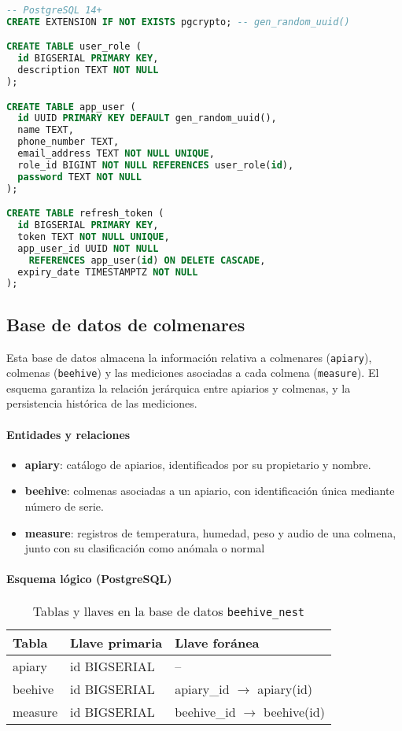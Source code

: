 \begin{lstlisting}[language=SQL, label={lst:guard-database-schema}, caption={Esquema de la base de datos guard-database}]
-- PostgreSQL 14+
CREATE EXTENSION IF NOT EXISTS pgcrypto; -- gen_random_uuid()

CREATE TABLE user_role (
  id BIGSERIAL PRIMARY KEY,
  description TEXT NOT NULL
);

CREATE TABLE app_user (
  id UUID PRIMARY KEY DEFAULT gen_random_uuid(),
  name TEXT,
  phone_number TEXT,
  email_address TEXT NOT NULL UNIQUE,
  role_id BIGINT NOT NULL REFERENCES user_role(id),
  password TEXT NOT NULL
);

CREATE TABLE refresh_token (
  id BIGSERIAL PRIMARY KEY,
  token TEXT NOT NULL UNIQUE,
  app_user_id UUID NOT NULL
    REFERENCES app_user(id) ON DELETE CASCADE,
  expiry_date TIMESTAMPTZ NOT NULL
);

\end{lstlisting}

\subsection{Base de datos de colmenares}
Esta base de datos almacena la información relativa a colmenares (\texttt{apiary}), colmenas (\texttt{beehive}) y las mediciones asociadas a cada colmena (\texttt{measure}).
El esquema garantiza la relación jerárquica entre apiarios y colmenas, y la persistencia histórica de las mediciones.

\paragraph{Entidades y relaciones}
\begin{itemize}
    \item \textbf{apiary}: catálogo de apiarios, identificados por su propietario y nombre.
    \item \textbf{beehive}: colmenas asociadas a un apiario, con identificación única mediante número de serie.
    \item \textbf{measure}: registros de temperatura, humedad, peso y audio de una colmena, junto con su clasificación como anómala o normal
\end{itemize}

\paragraph{Esquema lógico (PostgreSQL)}
\begin{table}[H]
\centering
\caption{Tablas y llaves en la base de datos \texttt{beehive\_nest}}
\label{tab:apiary_schema}
\begin{tabular}{|l|l|l|}
\hline
\textbf{Tabla} & \textbf{Llave primaria} & \textbf{Llave foránea} \\ \hline
apiary & id BIGSERIAL & -- \\ \hline
beehive & id BIGSERIAL & apiary\_id \(\rightarrow\) apiary(id) \\ \hline
measure & id BIGSERIAL & beehive\_id \(\rightarrow\) beehive(id) \\ \hline
\end{tabular}
\end{table}

